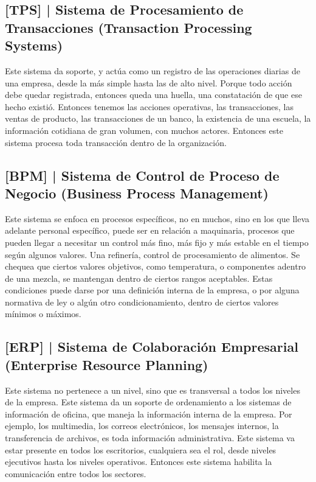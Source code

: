 \hypertarget{sistema-de-procesamiento-de-transacciones-tps}{%
\subsection{%
{[}TPS{]} |
Sistema de Procesamiento de Transacciones
(Transaction Processing Systems)
}\label{sistema-de-procesamiento-de-transacciones-tps}}

Este sistema da soporte, y actúa como un registro de las operaciones
diarias de una empresa, desde la más simple hasta las de alto nivel.
Porque todo acción debe quedar registrada, entonces queda una huella,
una constatación de que ese hecho existió. Entonces tenemos las acciones
operativas, las transacciones, las ventas de producto, las transacciones
de un banco, la existencia de una escuela, la información cotidiana de
gran volumen, con muchos actores. Entonces este sistema procesa toda
transacción dentro de la organización.

\hypertarget{sistema-de-control-de-proceso-de-negocio-bpm}{%
\subsection{%
{[}BPM{]} |
Sistema de Control de Proceso de Negocio
(Business Process Management)
}\label{sistema-de-control-de-proceso-de-negocio-bpm}}

Este sistema se enfoca en procesos específicos, no en muchos, sino en
los que lleva adelante personal específico, puede ser en relación a
maquinaria, procesos que pueden llegar a necesitar un control más fino,
más fijo y más estable en el tiempo según algunos valores. Una
refinería, control de procesamiento de alimentos. Se chequea que ciertos
valores objetivos, como temperatura, o componentes adentro de una
mezcla, se mantengan dentro de ciertos rangos aceptables. Estas
condiciones puede darse por una definición interna de la empresa, o por
alguna normativa de ley o algún otro condicionamiento, dentro de ciertos
valores mínimos o máximos.

\hypertarget{sistema-de-colaboraciuxf3n-empresarial-erp}{%
\subsection{%
{[}ERP{]} |
Sistema de Colaboración Empresarial
(Enterprise Resource Planning)
}\label{sistema-de-colaboraciuxf3n-empresarial-erp}}

Este sistema no pertenece a un nivel, sino que es transversal a todos
los niveles de la empresa. Este sistema da un soporte de ordenamiento a
los sistemas de información de oficina, que maneja la información
interna de la empresa. Por ejemplo, los multimedia, los correos
electrónicos, los mensajes internos, la transferencia de archivos, es
toda información administrativa. Este sistema va estar presente en todos
los escritorios, cualquiera sea el rol, desde niveles ejecutivos hasta
los niveles operativos. Entonces este sistema habilita la comunicación
entre todos los sectores.

